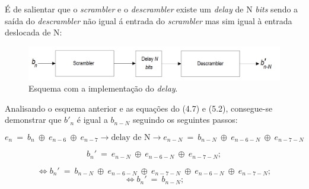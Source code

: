 \documentclass[11pt]{article}
\numberwithin{equation}{section}
\begin{document}
É de salientar que o \textit{scrambler} e o \textit{descrambler} existe um \textit{delay} de N \textit{bits} sendo a saída do \textit{descrambler} não igual á entrada do \textit{scrambler} mas sim igual à entrada deslocada de N:

\begin{figure}[H]
	\centering
	\includegraphics[keepaspectratio=true, scale=0.30]{teoricas/Ndelay}
	\caption{Esquema com a implementação do \textit{delay}.}
	\vspace{-0.8em}
\end{figure}

Analisando o esquema anterior e as equações do (4.7) e (5.2), consegue-se demonstrar que $b'_n$ é igual a $b_{n-N}$ seguindo os seguintes passos:

\vspace{-3mm}
\begin{equation}
e_n~= ~b_n~\oplus~e_{n-6}~\oplus~e_{n-7} \rightarrow \text{delay de N} \rightarrow e_{n-N}~= ~b_{n-N}~\oplus~e_{n-6-N}~\oplus~e_{n-7-N}
\end{equation}  

\vspace{-3mm}
\begin{equation}
 b_n'~= ~e_{n-N}~\oplus~e_{n-6-N}~\oplus~e_{n-7-N};
\end{equation}  

\vspace{-3mm}
\begin{equation}
\Leftrightarrow b_n'~= ~b_{n-N}~\oplus~e_{n-6-N}~\oplus~e_{n-7-N}~\oplus~e_{n-6-N}~\oplus~e_{n-7-N};
\end{equation}  
\vspace{-3mm}
\begin{equation}
\Leftrightarrow b_n'~= ~b_{n-N}; 
\end{equation}  
\end{document}
